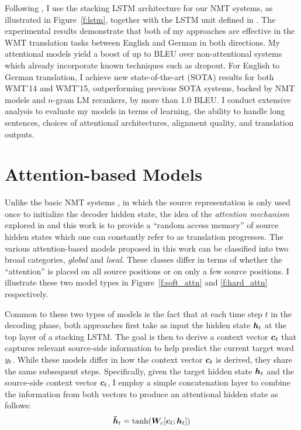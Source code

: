 Following \cite{sutskever14,luong15}, I use the stacking LSTM architecture for our NMT systems, as illustrated in Figure~\ref{f:lstm}, together with the LSTM unit defined in \cite{zaremba14}.
The experimental results demonstrate that both of my approaches are
effective in the WMT translation tasks between English and German in  both
directions. My attentional models yield a boost of up to \attngain{} BLEU over
non-attentional systems which already incorporate known techniques such as
dropout. For English to German translation, I achieve new state-of-the-art
(SOTA)
results for both WMT'14 and WMT'15, outperforming previous SOTA systems, backed by
NMT models and $n$-gram LM rerankers, by more than 1.0 BLEU. I conduct
extensive analysis to evaluate my models in terms of learning, the ability to
handle long sentences, choices of attentional architectures, alignment quality, and translation
outputs. 

\section{Attention-based Models}
\label{sec:attn}
Unlike the basic NMT systems \cite{kal13,sutskever14,cho14,luong15}, in which the source representation is only used once to initialize the decoder hidden state, the idea of the {\it attention mechanism} explored in \cite{bog15,jean15} and this work is to provide a ``random access memory'' of source hidden states which one can constantly refer to as translation progresses.
The various attention-based models proposed in this work can be classified into two broad categories, {\it global} and {\it local}. These classes differ in terms of whether the ``attention'' is placed on all source positions or on only a few source positions. I illustrate these two model types in Figure~\ref{f:soft_attn} and \ref{f:hard_attn} respectively.

Common to these two types of models is the fact that at each time step $t$ in the decoding phase, both approaches first take as input the hidden state $\mbox{\boldmath{$h$}}_{t}$ at the top layer of a stacking LSTM. The goal is then to derive a context vector $\mbox{\boldmath{$c$}}_{t}$ that captures relevant source-side information to help predict the current target word $y_{t}$. While these models differ in how the context vector $\mbox{\boldmath{$c$}}_{t}$ is derived, they share the same subsequent steps. 
Specifically, given the target hidden state $\mbox{\boldmath{$h$}}_{t}$ and the source-side context vector $\mbox{\boldmath{$c$}}_{t}$, I employ a simple concatenation layer to combine the information from both vectors to produce an attentional hidden state as follows:
\begin{equation}
\mbox{\boldmath{$\tilde{h}$}}_{t} = \tanh(\bm{W}_{c}[\mbox{\boldmath{$c$}}_{t}; \mbox{\boldmath{$h$}}_{t}])
\label{e:hs}
\end{equation} 

